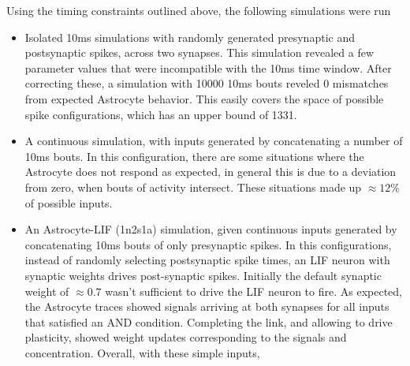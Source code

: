 Using the timing constraints outlined above, the following simulations were run
\begin{itemize}
  \item Isolated 10ms simulations with randomly generated presynaptic and
    postsynaptic spikes, across two synapses. This simulation revealed a few
    parameter values that were incompatible with the 10ms time window. After
    correcting these, a simulation with 10000 10ms bouts reveled 0 mismatches
    from expected Astrocyte behavior. This easily covers the space of possible
    spike configurations, which has an upper bound of 1331.

  \item A continuous simulation, with inputs generated by concatenating a number
    of 10ms bouts. In this configuration, there are some situations where the
    Astrocyte does not respond as expected, in general this is due to a \ca
    deviation from zero, when bouts of activity intersect. These situations made
    up $\approx 12\%$ of possible inputs.

  \item An Astrocyte-LIF (1n2s1a) simulation, given continuous inputs generated
    by concatenating 10ms bouts of only presynaptic spikes. In this
    configurations, instead of randomly selecting postsynaptic spike times, an
    LIF neuron with synaptic weights drives post-synaptic spikes. Initially the
    default synaptic weight of $\approx 0.7$ wasn't sufficient to drive the LIF
    neuron to fire. As expected, the Astrocyte traces showed \dser signals
    arriving at both synapses for all inputs that satisfied an AND
    condition. Completing the link, and allowing \ca to drive plasticity, showed
    weight updates corresponding to the \dser signals and \ca
    concentration. Overall, with these simple inputs, 
\end{itemize}



